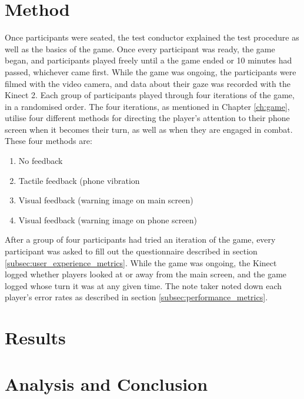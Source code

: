 \section{Method}
Once participants were seated, the test conductor explained the test procedure as well as the basics of the game. Once every participant was ready, the game began, and participants played freely until a the game ended or 10 minutes had passed, whichever came first. While the game was ongoing, the participants were filmed with the video camera, and data about their gaze was recorded with the Kinect 2. Each group of participants played through four iterations of the game, in a randomised order. The four iterations, as mentioned in Chapter \ref{ch:game}, utilise four different methods for directing the player's attention to their phone screen when it becomes their turn, as well as when they are engaged in combat. These four methods are:

\begin{enumerate}[label=\Alph*)]
	\item No feedback
	\item Tactile feedback (phone vibration
	\item Visual feedback (warning image on main screen)
	\item Visual feedback (warning image on phone screen)
\end{enumerate}

After a group of four participants had tried an iteration of the game, every participant was asked to fill out the questionnaire described in section \ref{subsec:user_experience_metrics}. While the game was ongoing, the Kinect logged whether players looked at or away from the main screen, and the game logged whose turn it was at any given time. The note taker noted down each player's error rates as described in section \ref{subsec:performance_metrics}.

\section{Results}

\section{Analysis and Conclusion}